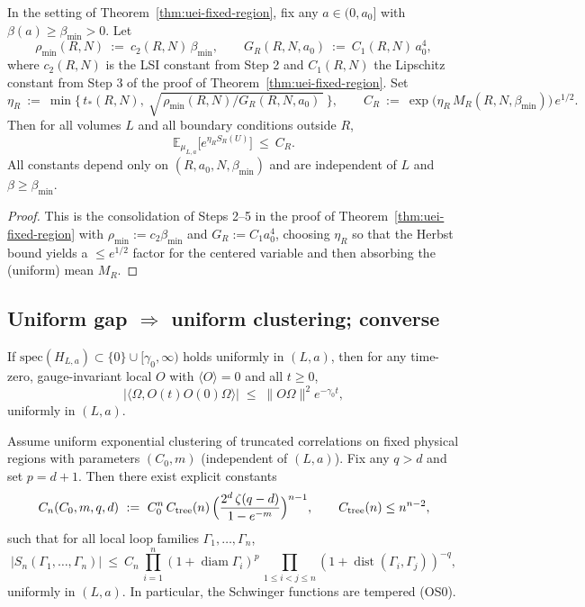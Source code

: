 \documentclass[11pt]{amsart}
\begin{document}
\begin{corollary}\label{cor:uei-explicit-constants}
In the setting of Theorem~\ref{thm:uei-fixed-region}, fix any $a\in(0,a_0]$ with $\beta(a)\ge \beta_{\min}>0$. Let
\[
  \rho_{\min}(R,N)\ :=\ c_2(R,N)\,\beta_{\min},\qquad
  G_R(R,N,a_0)\ :=\ C_1(R,N)\,a_0^4,
\]
where $c_2(R,N)$ is the LSI constant from Step 2 and $C_1(R,N)$ the Lipschitz constant from Step 3 of the proof of Theorem~\ref{thm:uei-fixed-region}. Set
\[
  \eta_R\ :=\ \min\Big\{\,t_*(R,N),\ \sqrt{\,\rho_{\min}(R,N)\big/ G_R(R,N,a_0)\,}\ \Big\},\qquad
  C_R\ :=\ \exp\big(\eta_R\,M_R(R,N,\beta_{\min})\big)\,e^{1/2}.
\]
Then for all volumes $L$ and all boundary conditions outside $R$,
\[
  \mathbb{E}_{\mu_{L,a}}\big[e^{\eta_R S_R(U)}\big]\ \le\ C_R.
\]
All constants depend only on $(R,a_0,N,\beta_{\min})$ and are independent of $L$ and $\beta\ge \beta_{\min}$.
\end{corollary}

\begin{proof}
This is the consolidation of Steps 2--5 in the proof of Theorem~\ref{thm:uei-fixed-region} with $\rho_{\min}:=c_2\beta_{\min}$ and $G_R:=C_1 a_0^4$, choosing $\eta_R$ so that the Herbst bound yields a $\le e^{1/2}$ factor for the centered variable and then absorbing the (uniform) mean $M_R$.
\end{proof}

\subsection*{Uniform gap $\Rightarrow$ uniform clustering; converse}

\begin{proposition}\label{prop:gap-to-cluster}
If $\mathrm{spec}(H_{L,a})\subset\{0\}\cup[\gamma_0,\infty)$ holds uniformly in $(L,a)$, then for any time-zero, gauge-invariant local $O$ with $\langle O\rangle=0$ and all $t\ge 0$,
\[
  |\langle\Omega, O(t)O(0)\Omega\rangle|\;\le\;\|O\Omega\|^2 e^{-\gamma_0 t},
\]
uniformly in $(L,a)$.
\end{proposition}

\begin{proposition}\label{prop:OS0-poly}
Assume uniform exponential clustering of truncated correlations on fixed physical regions with parameters $(C_0,m)$ (independent of $(L,a)$). Fix any $q>d$ and set $p=d+1$. Then there exist explicit constants
\[
  C_n(C_0,m,q,d)\ :=\ C_0^n\,C_{\mathrm{tree}}(n)\,\Bigl(\frac{2^d\,\zeta(q-d)}{1-e^{-m}}\Bigr)^{n-1},\qquad C_{\mathrm{tree}}(n)\le n^{n-2},
\]
such that for all local loop families $\Gamma_1,\dots,\Gamma_n$,
\[
  |S_n(\Gamma_1,\dots,\Gamma_n)|\ \le\ C_n\,\prod_{i=1}^n (1+\operatorname{diam}\Gamma_i)^p\,\prod_{1\le i<j\le n} (1+\operatorname{dist}(\Gamma_i,\Gamma_j))^{-q},
\]
uniformly in $(L,a)$. In particular, the Schwinger functions are tempered (OS0).
\end{proposition}
\end{document}

